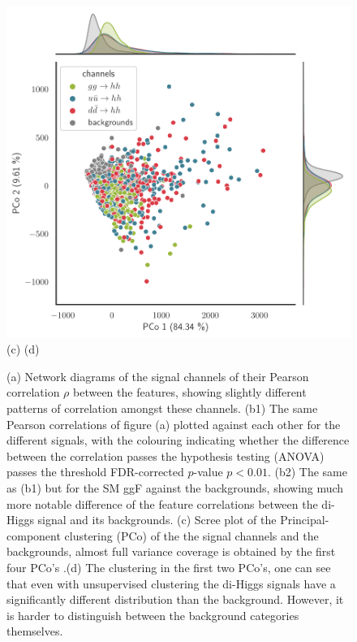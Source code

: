 \begin{figure}[h!]
						\includegraphics[height=0.25\textheight]{fig/netzwerk/pca_unsupervised-1}\\
							  \hspace{.8 cm} 			  { \footnotesize  (c)}    \hspace{6. cm}        { \footnotesize  (d)} 
	\caption{(a) Network diagrams of the signal channels of their Pearson correlation $\rho$ between the features, showing slightly different patterns of correlation amongst these channels. (b1) The same  Pearson correlations of figure (a) plotted against each other for the different signals, with the colouring indicating whether the difference between the correlation passes the hypothesis testing (ANOVA) passes the threshold  FDR-corrected $p$-value $ p< 0. 01$. (b2) The same as (b1) but for the SM ggF against the backgrounds, showing much more notable difference of the feature correlations between the di-Higgs signal and its backgrounds. (c) Scree plot of the Principal-component clustering (PCo) of the the signal channels and the backgrounds, almost full variance coverage is obtained by the first four PCo's .(d) The clustering in the first two PCo's, one can see that even with unsupervised clustering the di-Higgs signals have a significantly different distribution than the background. However, it is harder to distinguish between the background categories themselves.}
	\label{fig:cor-net}
\end{figure}
